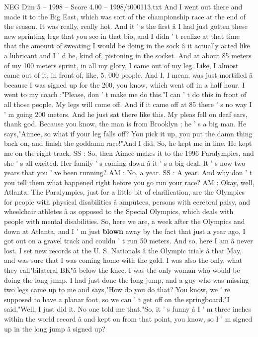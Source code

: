 \begin{textsample}{NEG Dim 5 – 1998 – Score 4.00 – 1998/t000113.txt}
And I went out there and made it to the Big East, which was sort of the championship race at the end of the season.
It was really, really hot.
And it ' s the first â I had just gotten these new sprinting legs that you see in that bio, and I didn ' t realize at that time that the amount of sweating I would be doing in the sock â it actually acted like a lubricant and I ' d be, kind of, pistoning in the socket.
And at about 85 meters of my 100 meters sprint, in all my glory, I came out of my leg.
Like, I almost came out of it, in front of, like, 5, 000 people.
And I, I mean, was just mortified â because I was signed up for the 200, you know, which went off in a half hour.
I went to my coach :"Please, don ' t make me do this."I can ' t do this in front of all those people.
My legs will come off.
And if it came off at 85 there ' s no way I ' m going 200 meters.
And he just sat there like this.
My pleas fell on deaf ears, thank god.
Because you know, the man is from Brooklyn ; he ' s a big man.
He says,"Aimee, so what if your leg falls off?
You pick it up, you put the damn thing back on, and finish the goddamn race!"And I did.
So, he kept me in line.
He kept me on the right track.
SS : So, then Aimee makes it to the 1996 Paralympics, and she ' s all excited.
Her family ' s coming down â it ' s a big deal.
It ' s now two years that you ' ve been running?
AM : No, a year.
SS : A year.
And why don ' t you tell them what happened right before you go run your race?
AM : Okay, well, Atlanta.
The Paralympics, just for a little bit of clarification, are the Olympics for people with physical disabilities â amputees, persons with cerebral palsy, and wheelchair athletes â as opposed to the Special Olympics, which deals with people with mental disabilities.
So, here we are, a week after the Olympics and down at Atlanta, and I ' m just \textbf{blown} away by the fact that just a year ago, I got out on a gravel track and couldn ' t run 50 meters.
And so, here I am â never lost.
I set new records at the U.
S.
Nationals â the Olympic trials â that May, and was sure that I was coming home with the gold.
I was also the only, what they call"bilateral BK"â below the knee.
I was the only woman who would be doing the long jump.
I had just done the long jump, and a guy who was missing two legs came up to me and says,"How do you do that?
You know, we ' re supposed to have a planar foot, so we can ' t get off on the springboard."I said,"Well, I just did it.
No one told me that."So, it ' s funny â I ' m three inches within the world record â and kept on from that point, you know, so I ' m signed up in the long jump â signed up?

\end{textsample}
